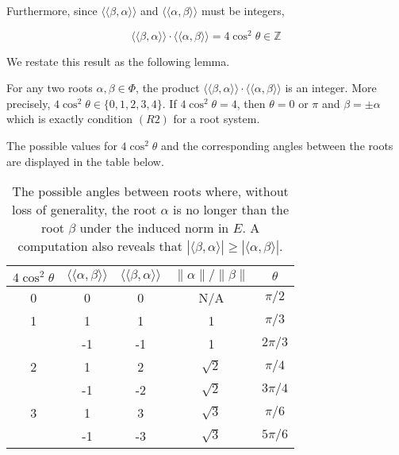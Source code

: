 Furthermore, since $\langle \langle \beta, \alpha \rangle \rangle$ and $\langle \langle \alpha, \beta \rangle \rangle$
must be integers,

\begin{equation*}
    \langle \langle \beta, \alpha \rangle \rangle \cdot \langle \langle \alpha, \beta \rangle \rangle = 4 \cos^2 \theta \in \mathbb{Z}
\end{equation*}

We restate this result as the following lemma.
\begin{lemma}
    For any two roots $\alpha, \beta \in \Phi$, the product
    $\langle \langle \beta, \alpha \rangle \rangle \cdot \langle \langle \alpha, \beta \rangle \rangle$ is an integer.
    More precisely, $4 \cos^2 \theta \in \{ 0, 1, 2, 3, 4 \}.$
    If $4 \cos^2 \theta = 4$, then $\theta = 0$ or $\pi$ and $\beta = \pm \alpha$ which is exactly condition $(R2)$ for a root system.
\end{lemma}

The possible values for $4 \cos^2 \theta$ and the corresponding angles between the roots are displayed in the table below.

\begin{table}[h]
\label{table:enum}
\begin{center}
\begin{tabular}{|| c  c  c  c  c ||}
    \hline $4\cos^2\theta$
&   $\langle \langle \alpha, \beta \rangle \rangle$
&   $\langle \langle \beta, \alpha \rangle \rangle$
&   $\|\alpha\| / \|\beta\|$
&   $\theta$ \\ \hline \hline
    0 & 0 & 0 & N/A & $\pi/2$ \\ \hline
    
    1 & 1 & 1 & 1 & $\pi/3$ \\
      & -1 & -1 & 1 & $2\pi/3$ \\ \hline
    
    2 & 1 & 2 & $\sqrt{2}$ & $\pi/4$  \\
      & -1 & -2 & $\sqrt{2}$ & $3\pi/4$ \\ \hline
    
    3 & 1 & 3 & $\sqrt{3}$ & $\pi/6$ \\
      &-1 & -3 & $\sqrt{3}$ & $5\pi/6$ \\ \hline
\end{tabular}
\end{center}
\caption{The possible angles between roots where, without loss of generality,
the root $\alpha$ is no longer than the root $\beta$ under the induced norm in $E$.
A computation also reveals that $|\langle \beta, \alpha \rangle| \geq |\langle \alpha, \beta \rangle|$.}
\end{table}

